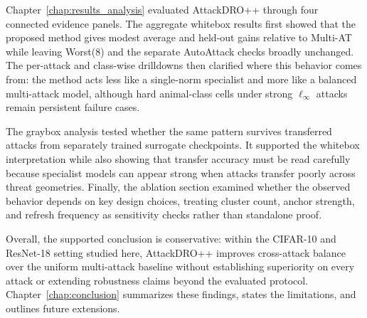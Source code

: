 Chapter~\ref{chap:results_analysis} evaluated AttackDRO++ through four connected
evidence panels. The aggregate whitebox results first showed that the proposed
method gives modest average and held-out gains relative to Multi-AT while
leaving Worst(8) and the separate AutoAttack checks broadly unchanged. The
per-attack and class-wise drilldowns then clarified where this behavior comes
from: the method acts less like a single-norm specialist and more like a
balanced multi-attack model, although hard animal-class cells under strong
\(\ell_\infty\) attacks remain persistent failure cases.

The graybox analysis tested whether the same pattern survives transferred
attacks from separately trained surrogate checkpoints. It supported the
whitebox interpretation while also showing that transfer accuracy must be read
carefully because specialist models can appear strong when attacks transfer
poorly across threat geometries. Finally, the ablation section examined whether
the observed behavior depends on key design choices, treating cluster count,
anchor strength, and refresh frequency as sensitivity checks rather than
standalone proof.

Overall, the supported conclusion is conservative: within the CIFAR-10 and
ResNet-18 setting studied here, AttackDRO++ improves cross-attack balance over
the uniform multi-attack baseline without establishing superiority on every
attack or extending robustness claims beyond the evaluated protocol. Chapter~\ref{chap:conclusion}
summarizes these findings, states the limitations, and outlines future
extensions.
